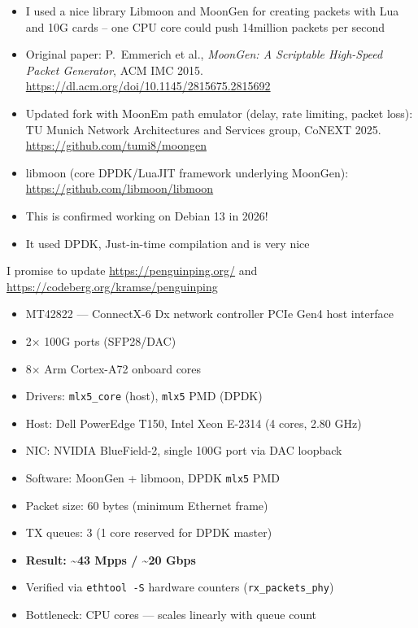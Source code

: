 \documentclass[Screen16to9,17pt]{foils}
\begin{document}


\begin{itemize}
\item I used a nice library Libmoon and MoonGen for creating packets with Lua and 10G cards -- one CPU core could push 14million packets per second
\item Original paper: P.~Emmerich et al., \emph{MoonGen: A Scriptable High-Speed Packet Generator}, ACM IMC 2015. \url{https://dl.acm.org/doi/10.1145/2815675.2815692}
\item Updated fork with MoonEm path emulator (delay, rate limiting, packet loss): TU Munich Network Architectures and Services group, CoNEXT 2025. \url{https://github.com/tumi8/moongen}
\item libmoon (core DPDK/LuaJIT framework underlying MoonGen): \url{https://github.com/libmoon/libmoon}
\item This is confirmed working on Debian 13 in 2026!
\item It used DPDK, Just-in-time compilation and is very nice
\end{itemize}

I promise to update \url{https://penguinping.org/} and \url{https://codeberg.org/kramse/penguinping}



\begin{itemize}
\item MT42822 — ConnectX-6 Dx network controller PCIe Gen4 host interface
\item 2× 100G ports (SFP28/DAC)
\item 8× Arm Cortex-A72 onboard cores
\item Drivers: \verb+mlx5_core+ (host), \verb+mlx5+ PMD (DPDK)
 \end{itemize}

\begin{itemize}
\item Host: Dell PowerEdge T150, Intel Xeon E-2314 (4 cores, 2.80 GHz)
\item NIC: NVIDIA BlueField-2, single 100G port via DAC loopback
\item Software: MoonGen + libmoon, DPDK \verb+mlx5+ PMD
\item Packet size: 60 bytes (minimum Ethernet frame)
\item TX queues: 3 (1 core reserved for DPDK master)
\item \textbf{Result: \textasciitilde{}43 Mpps / \textasciitilde{}20 Gbps}
\item Verified via \verb+ethtool -S+ hardware counters (\verb+rx_packets_phy+)
\item Bottleneck: CPU cores — scales linearly with queue count
\end{itemize}
\end{document}
